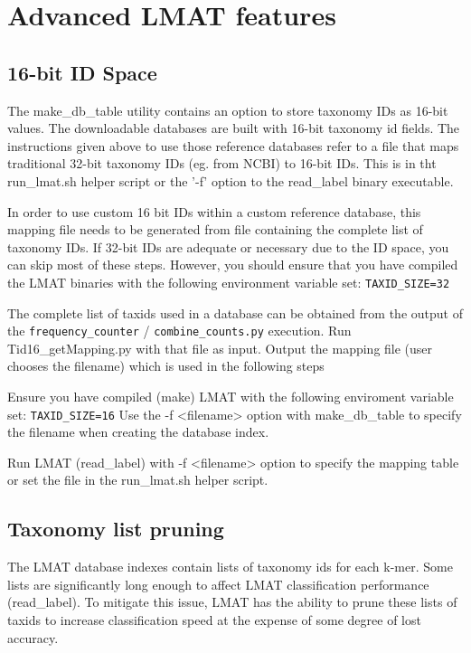 \documentclass[11pt]{article}
\begin{document}
\section{Advanced LMAT features}

\subsection{16-bit ID Space}

The make\_db\_table utility contains an option to store taxonomy IDs as 16-bit values.  The downloadable databases are built with 16-bit taxonomy id fields.  The instructions given above to use those reference databases refer to a file that maps traditional 32-bit taxonomy IDs (eg. from NCBI) to 16-bit IDs.  This is in tht run\_lmat.sh helper script or the '-f' option to the read\_label binary executable.

In order to use custom 16 bit IDs within a custom reference database, this mapping file  needs to be generated from file containing the complete list of taxonomy IDs.  If 32-bit IDs are adequate or necessary due to the ID space, you can skip most of these steps.  However, you should ensure that you have compiled the LMAT binaries with the following environment variable set:  \texttt{TAXID\_SIZE=32}  

  The complete list of taxids used in a database can be obtained from the output of the \texttt{frequency\_counter} / \texttt{combine\_counts.py} execution.  Run Tid16_getMapping.py with that file as input.  Output the mapping file (user chooses the filename) which is used in the following steps

Ensure you have compiled (make) LMAT with the following enviroment variable set:  \texttt{TAXID\_SIZE=16}
Use the -f <filename> option with make\_db\_table to specify the filename when creating the database index.

Run LMAT (read\_label) with -f <filename> option to specify the mapping table or set the file in the run\_lmat.sh helper script.

\subsection{Taxonomy list pruning}

The LMAT database indexes contain lists of taxonomy ids for each k-mer.  Some lists are significantly long enough to affect LMAT classification performance (read\_label).  To mitigate this issue, LMAT has the ability to prune these lists of taxids to increase classification speed at the expense of some degree of lost accuracy.
\end{document}
